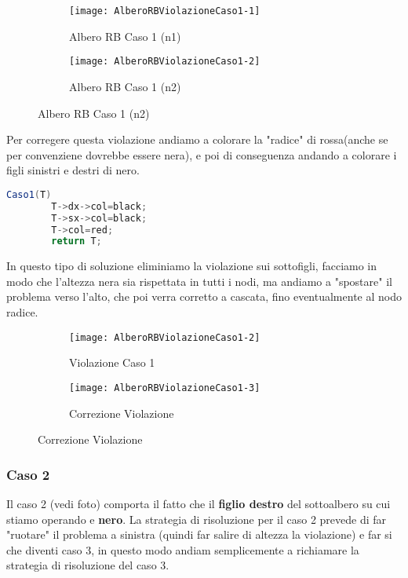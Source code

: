 \begin{figure}[H]
    \centering
    \begin{subfigure}[b]{0.35\textwidth}
        \texttt{[image: AlberoRBViolazioneCaso1-1]} 
        \caption{Albero RB Caso 1 (n1)}
    \end{subfigure}
    \hfill
    \begin{subfigure}[b]{0.35\textwidth}
        \texttt{[image: AlberoRBViolazioneCaso1-2]} 
        \caption{Albero RB Caso 1 (n2)}
    \end{subfigure}
\end{figure}

Per corregere questa violazione andiamo a colorare la "radice" di rossa(anche se per convenziene dovrebbe essere nera), e poi di conseguenza andando a colorare i figli sinistri e destri di nero.
\begin{lstlisting}[language=Java]
	Caso1(T)
		T->dx->col=black;
		T->sx->col=black;
		T->col=red;
		return T;
\end{lstlisting}

In questo tipo di soluzione eliminiamo la violazione sui sottofigli, facciamo in modo che l'altezza nera sia rispettata in tutti i nodi, ma andiamo a "spostare" il problema verso l'alto, che poi verra corretto a cascata, fino eventualmente al nodo radice.

\begin{figure}[H]
    \centering
    \begin{subfigure}[b]{0.35\textwidth}
        \texttt{[image: AlberoRBViolazioneCaso1-2]} 
        \caption{Violazione Caso 1}
    \end{subfigure}
    \hfill
    \begin{subfigure}[b]{0.35\textwidth}
        \texttt{[image: AlberoRBViolazioneCaso1-3]} 
        \caption{Correzione Violazione}
    \end{subfigure}
\end{figure}


\subsubsection{Caso 2}

Il caso 2 (vedi foto) comporta il fatto che il \textbf{figlio destro} del sottoalbero su cui stiamo operando e \textbf{nero}. La strategia di risoluzione per il caso 2 prevede di far "ruotare" il problema a sinistra (quindi far salire di altezza la violazione) e far si che diventi caso 3, in questo modo andiam semplicemente a richiamare la strategia di risoluzione del caso 3.

